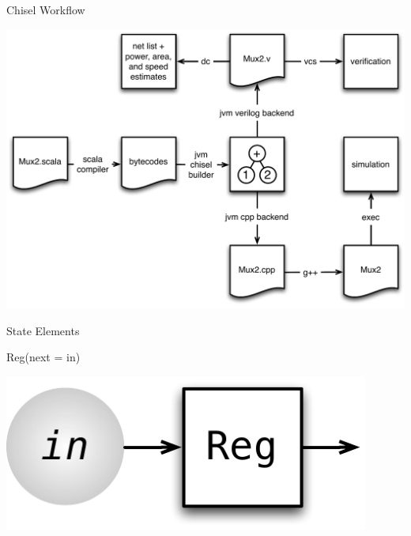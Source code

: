 \documentclass[xcolor=pdflatex,dvipsnames,table]{beamer}
\begin{document}
\begin{frame}{Chisel Workflow}
\begin{center}
\includegraphics[height=0.9\textheight]{../bootcamp/figs/chisel-workflow.pdf}
\end{center}
\end{frame}



\begin{frame}[fragile]{State Elements}

\begin{scala}
Reg(next = in)
\end{scala}

\begin{center}
\includegraphics[width=0.9\textwidth]{figs/reg-in.pdf} 
\end{center}

\end{frame}
\end{document}
